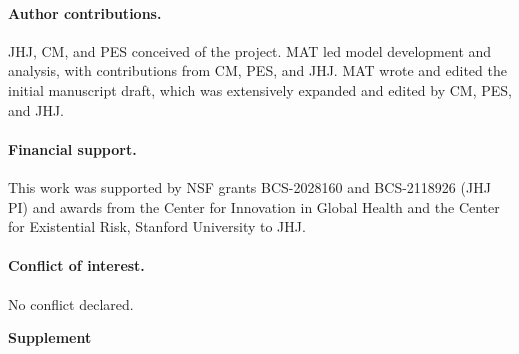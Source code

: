 \documentclass[letterpaper,11.5pt]{scrartcl}
\begin{document}
\paragraph{Author contributions.} JHJ, CM, and PES conceived of the project. MAT led model development and analysis, with contributions from CM, PES, and JHJ. MAT wrote and edited the initial manuscript draft, which was extensively expanded and edited by CM, PES, and JHJ.

\paragraph{Financial support.} This work was supported by NSF grants BCS-2028160 and BCS-2118926 (JHJ PI) and  awards from the Center for Innovation in Global Health and the Center for Existential Risk, Stanford University to JHJ.

\paragraph{Conflict of interest.} No conflict declared.





\pagebreak
\begin{center}
  \textbf{\Large \textsf{Supplement}}
\end{center}
\setcounter{equation}{1}
\setcounter{figure}{0}
\setcounter{section}{0}
\setcounter{table}{0}
\setcounter{page}{1}
\makeatletter
\renewcommand{\theequation}{S\arabic{equation}}
\renewcommand{\thefigure}{S\arabic{figure}}
\renewcommand{\thetable}{S\arabic{table}}
\renewcommand{\thesection}{S\arabic{section}}
\renewcommand{\thepage}{S\arabic{page}}
\end{document}
